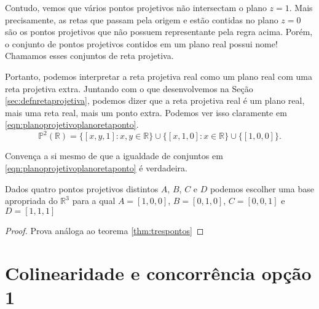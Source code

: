 Contudo, vemos que vários pontos projetivos não intersectam o plano \(z = 1\).
Mais precisamente, as retas que passam pela origem e estão contidas no plano \(z = 0\) são os pontos projetivos que não possuem representante pela regra acima.
Porém, o conjunto de pontos projetivos contidos em um plano real possui nome!
Chamamos esses conjuntos de reta projetiva.

Portanto, podemos interpretar a reta projetiva real como um plano real com uma reta projetiva extra.
Juntando com o que desenvolvemos na Seção \ref{sec:defnretaprojetiva}, podemos dizer que a reta projetiva real é um plano real, mais uma reta real, mais um ponto extra.
Podemos ver isso claramente em \ref{eqn:planoprojetivoplanoretaponto}.
\begin{equation} \label{eqn:planoprojetivoplanoretaponto}
  \mathbb{P}^2(\mathbb{R}) = \{ [x, y, 1] : x, y \in \mathbb{R} \} \cup \{[x, 1, 0] : x \in \mathbb{R}\} \cup \{[1, 0, 0]\}.
\end{equation}

\begin{exer}
  Convença a si mesmo de que a igualdade de conjuntos em \ref{eqn:planoprojetivoplanoretaponto} é verdadeira.
\end{exer}

\begin{thm} \label{thm:quatropontos}
  Dados quatro pontos projetivos distintos \(A\), \(B\), \(C\) e \(D\) podemos escolher uma base apropriada do \(\mathbb{R}^3\) para a qual \(A = [1, 0, 0]\),  \(B = [0, 1, 0]\), \(C = [0, 0, 1]\) e \( D = [1, 1, 1]\)
\end{thm}
\begin{proof}
Prova análoga ao teorema \ref{thm:trespontos}
\end{proof}

\section{Colinearidade e concorrência opção 1}



